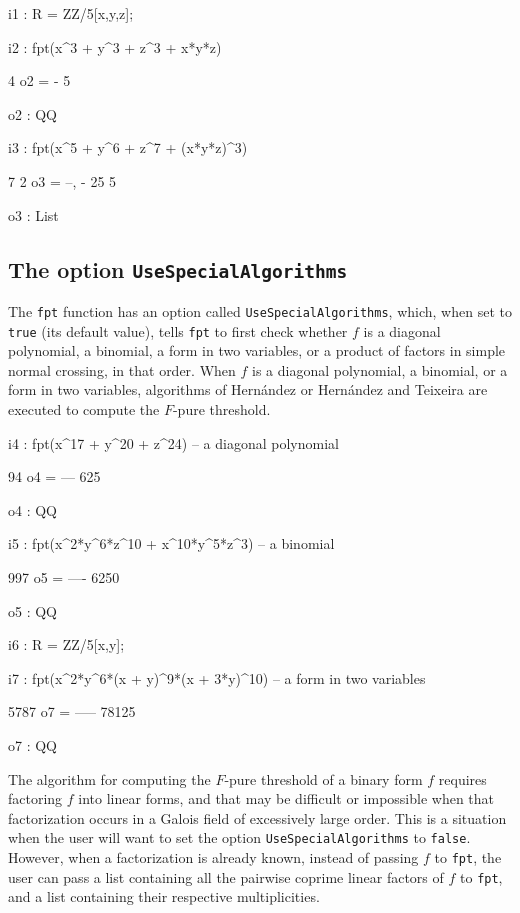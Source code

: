 \documentclass{amsart}
\begin{document}
\smallskip
{\small
{}
\begin{MyVerbatim}
i1 : R = ZZ/5[x,y,z];

i2 : fpt(x^3 + y^3 + z^3 + x*y*z)

     4
o2 = -
     5

o2 : QQ

i3 : fpt(x^5 + y^6 + z^7 + (x*y*z)^3)

       7  2
o3 = {--, -}
      25  5

o3 : List
\end{MyVerbatim}
}


\subsection{The option \texttt{UseSpecialAlgorithms}}\label{ss: UseSpecialAlgorithms}

The \texttt{fpt} function has an option called \texttt{UseSpecialAlgorithms}, which, when set to \texttt{true} (its default value), tells \texttt{fpt} to first check whether $f$ is a diagonal polynomial, a binomial, a form in two variables, or a product of factors in simple normal crossing, in that order.
When $f$ is a diagonal polynomial, a binomial, or a form in two variables, algorithms of Hern\'andez \cite{HernandezFInvariantsOfDiagonalHyp, HernandezFPureThresholdOfBinomial} or Hern\'andez and Teixeira \cite{HernandezTeixeiraFThresholdFunctions} are executed to compute the $F$-pure threshold.

\smallskip
{\small
{}
\begin{MyVerbatim}
i4 : fpt(x^17 + y^20 + z^24) -- a diagonal polynomial

      94
o4 = ---
     625

o4 : QQ

i5 : fpt(x^2*y^6*z^10 + x^10*y^5*z^3) -- a binomial

      997
o5 = ----
     6250

o5 : QQ

i6 : R = ZZ/5[x,y];

i7 : fpt(x^2*y^6*(x + y)^9*(x + 3*y)^10) -- a form in two variables

      5787
o7 = -----
     78125

o7 : QQ
\end{MyVerbatim}
}
\smallskip

\noindent The algorithm for computing the $F$-pure threshold of a binary form $f$ requires factoring $f$ into linear forms, and that may be difficult or impossible when that factorization occurs in a Galois field of excessively large order.
This is a situation when the user will want to set the option \texttt{UseSpecialAlgorithms} to \texttt{false}.
However, when a factorization is already known, instead of passing $f$ to \texttt{fpt}, the user can pass a list containing all the pairwise coprime linear factors of $f$ to \texttt{fpt}, and a list containing their respective multiplicities.
\end{document}

